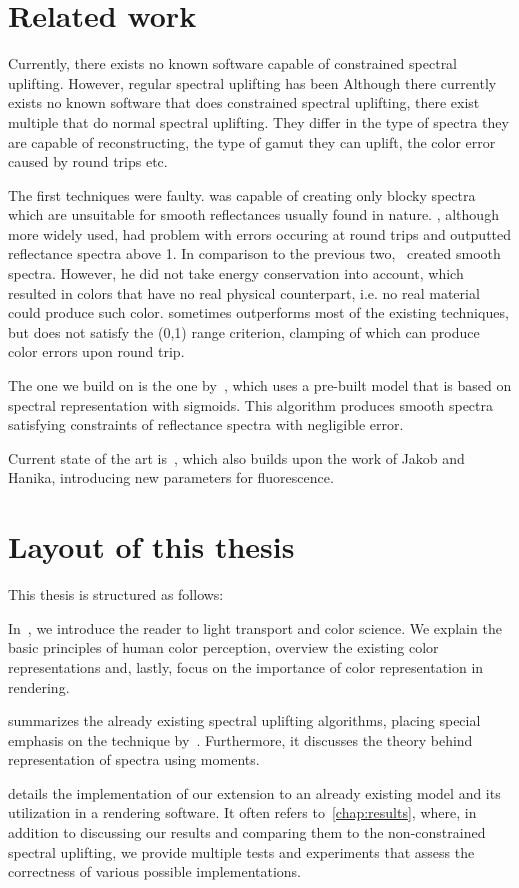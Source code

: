 \section*{Related work}

Currently, there exists no known software capable of constrained spectral uplifting. However, regular spectral uplifting has been 
Although there currently exists no known software that does constrained spectral uplifting, there exist multiple that do normal spectral uplifting. They differ in the type of spectra they are capable of reconstructing, the type of gamut they can uplift, the color error caused by round trips etc. 

The first techniques were faulty. \citet{upsamplingMacAdam} was capable of creating only blocky spectra which are unsuitable for smooth reflectances usually found in nature. \citet{upsamplingSmits}, although more widely used, had problem with errors occuring at round trips and outputted reflectance spectra above 1. In comparison to the previous two,~\citet{upsamplingMeng} created smooth spectra. However, he did not take energy conservation into account, which resulted in colors that have no real physical counterpart, i.e. no real material could produce such color. \citet{upsamplingOtsu} sometimes outperforms most of the existing techniques, but does not satisfy the (0,1) range criterion, clamping of which can produce color errors upon round trip.

The one we build on is the one by~\citet{upsamplingJakobHanika}, which uses a pre-built model that is based on spectral representation with sigmoids. This algorithm produces smooth spectra satisfying constraints of reflectance spectra with negligible error. 

Current state of the art is~\citet{upsamplingFluorescence}, which also builds upon the work of Jakob and Hanika, introducing new parameters for fluorescence. 

\section*{Layout of this thesis}

This thesis is structured as follows:

In~, we introduce the reader to light transport and color science. We explain the basic principles of human color perception, overview the existing color representations and, lastly, focus on the importance of color representation in rendering.

 summarizes the already existing spectral uplifting algorithms, placing special emphasis on the technique by~\citet{upsamplingJakobHanika}. Furthermore, it discusses the theory behind representation of spectra using moments.

 details the implementation of our extension to an already existing model and its utilization in a rendering software. It often refers to~\cref{chap:results}, where, in addition to discussing our results and comparing them to the non-constrained spectral uplifting, we provide multiple tests and experiments that assess the correctness of various possible implementations.